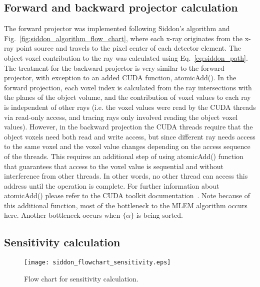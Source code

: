 \subsection{Forward and backward projector calculation}
The forward projector was implemented following Siddon's algorithm and Fig.~\ref{fig:siddon_algorithm_flow_chart}, where each x-ray originates from the x-ray point source and travels to the pixel center of each detector element.  The object voxel contribution to the ray was calculated using Eq.~\ref{eq:siddon_path}.  The treatment for the backward projector is very similar to the forward projector, with exception to an added CUDA function, atomicAdd().  In the forward projection, each voxel index is calculated from the ray intersections with the planes of the object volume, and the contribution of voxel values to each ray is independent of other rays (i.e. the voxel values were read by the CUDA threads via read-only access, and tracing rays only involved reading the object voxel values).  However, in the backward projection the CUDA threads require that the object voxels need both read and write access, but since different ray needs access to the same voxel and the voxel value changes depending on the access sequence of the threads.  This requires an additional step of using atomicAdd() function that guarantees that access to the voxel value is sequential and without interference from other threads.  In other words, no other thread can access this address until the operation is complete.  For further information about atomicAdd() please refer to the CUDA toolkit documentation~\cite{Cudatoolkit}.  Note because of this additional function, most of the bottleneck to the MLEM algorithm occurs here.  Another bottleneck occurs when $\{ \alpha \}$ is being sorted.

\subsection{Sensitivity calculation}

\begin{figure}[h]
\centering
\texttt{[image: siddon\_flowchart\_sensitivity.eps]}
\caption{Flow chart for sensitivity calculation.}
\label{fig:sensitivityslices}
\end{figure}

